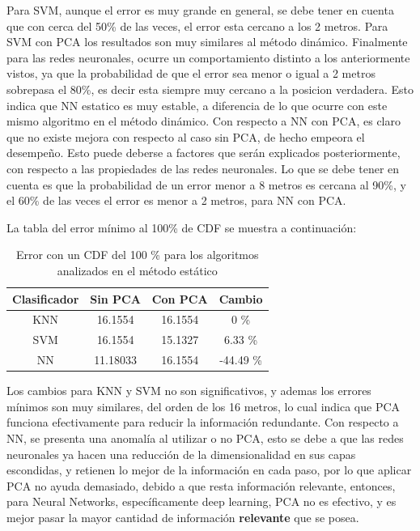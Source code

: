Para SVM, aunque el error es muy grande en general, se debe tener en cuenta que con cerca del 50\% de las veces, el error esta cercano a los 2 metros. Para SVM con PCA los resultados son muy similares al método dinámico. Finalmente para las redes neuronales, ocurre un comportamiento distinto a los anteriormente vistos, ya que la probabilidad de que el error sea menor o igual a 2 metros sobrepasa el 80\%, es decir esta siempre muy cercano a la posicion  verdadera. Esto indica que NN estatico es muy estable, a diferencia de lo que ocurre con este mismo algoritmo en el método dinámico. Con respecto a NN con PCA, es claro que no existe mejora con respecto al caso sin PCA, de hecho empeora el desempeño. Esto puede deberse a factores que serán explicados posteriormente, con respecto a las propiedades de las redes neuronales. Lo que se debe tener en cuenta es que la probabilidad de un error menor a 8 metros es cercana al 90\%, y el 60\% de las veces el error es menor a 2 metros,  para NN con PCA.

La tabla del error mínimo al 100\% de CDF se muestra a continuación:

\begin{table}[!h]
\centering
\caption{Error con un CDF del 100 \% para los algoritmos analizados  en el método estático}
\label{cambio-cdf-estatico}
\begin{tabular}{|c|c|c|c|}
\hline
Clasificador & Sin PCA  & Con PCA & Cambio    \\ \hline
KNN          & 16.1554  & 16.1554 & 0 \%      \\ \hline
SVM          & 16.1554  & 15.1327 & 6.33 \%   \\ \hline
NN           & 11.18033 & 16.1554 & -44.49 \% \\ \hline
\end{tabular}
\end{table}

Los cambios para KNN y SVM no son significativos, y ademas los errores mínimos son muy similares, del orden de los 16 metros, lo cual indica que PCA funciona efectivamente para reducir la información redundante. Con respecto a NN, se presenta una anomalía al utilizar o no PCA, esto se debe a que las redes neuronales ya hacen una reducción de la dimensionalidad en sus capas escondidas, y retienen lo mejor de la información en cada paso, por lo que aplicar PCA no ayuda demasiado, debido a que resta información relevante, entonces, para Neural Networks, específicamente deep learning, PCA no es efectivo, y es mejor pasar la mayor cantidad de información \textbf{relevante} que se posea.

